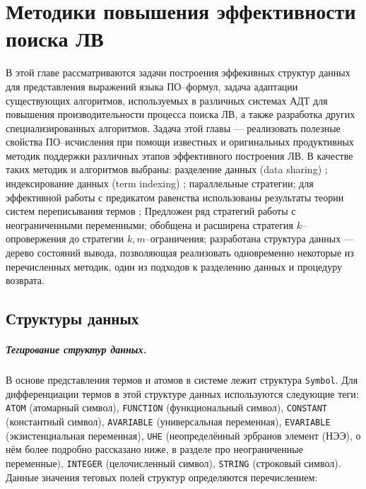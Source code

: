 \chapter{Методики повышения эффективности поиска ЛВ}
\label{part:two}

В этой главе рассматриваются задачи построения эффекивных структур данных для представления выражений языка ПО--формул, задача адаптации существующих алгоритмов, используемых в различных системах АДТ для повышения производительности процесса поиска ЛВ, а также разработка других специализированных алгоритмов. Задача этой главы --- реализовать полезные свойства ПО--исчисления при помощи известных и оригинальных продуктивных методик поддержки различных этапов эффективного построения ЛВ. В качестве таких методик и алгоритмов выбраны: разделение данных (data sharing) \cite{Che2, Ryazanov2003}; индексирование данных (term indexing) \cite{HARIndex, TermIndexingBook,pathindex}; параллельные стратегии; для эффективной работы с предикатом равенства использованы результаты теории систем переписывания термов \cite{Nipkow}; Предложен ряд стратегий работы с неограниченными переменными; обобщена и расширена стратегия $k$--опровержения \cite{ICDS2000, dissChe} до стратегии $k,m$--ограничения; разработана структура данных --- дерево состояний вывода, позволяющая реализовать одновременно некоторые из перечисленных методик, один из подходов к разделению данных и процедуру возврата.


\section{Структуры данных}


\paragraph{Тегирование структур данных.}
В основе представления термов и атомов в системе лежит структура \texttt{Symbol}. %
Для дифференциации термов в этой структуре данных используются следующие теги: \texttt{ATOM} (атомарный символ), \texttt{FUNCTION} (функциональный символ), \texttt{CONSTANT} (константный символ), \texttt{AVARIABLE} (универсальная переменная), \texttt{EVARIABLE} (экзистенциальная переменная), \texttt{UHE} (неопределённый эрбранов элемент (НЭЭ), о нём более подробно рассказано ниже, в разделе про неограниченные переменные), \texttt{INTEGER} (целочисленный символ), \texttt{STRING} (строковый символ). Данные значения теговых полей структур определяются перечислением:

